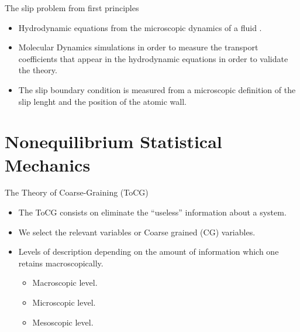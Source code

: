 \documentclass{beamer}
\begin{document}
\begin{frame}{The slip problem from first principles}
  \begin{itemize}
\item Hydrodynamic equations from the microscopic dynamics of a fluid \cite{Piccirelli1968}.
\item Molecular Dynamics simulations in order to measure the transport coefficients that appear in the hydrodynamic equations in order to validate the theory.
\item The slip boundary condition is measured from a microscopic definition of the slip lenght and the position of the atomic wall. 
\end{itemize}
\end{frame}

\section{Nonequilibrium Statistical Mechanics}
\begin{frame}{The Theory of Coarse-Graining (ToCG)}
\begin{itemize}
\item The ToCG consists on eliminate the ``useless'' information about a system. 
\item We select the relevant variables or Coarse grained (CG) variables.
\item Levels of description depending on the amount of information which one retains macroscopically.
  \begin{itemize}
    \item Macroscopic level.
    \item Microscopic level.
    \item Mesoscopic level.
    \end{itemize}
\end{itemize}
\end{frame}
\end{document}
